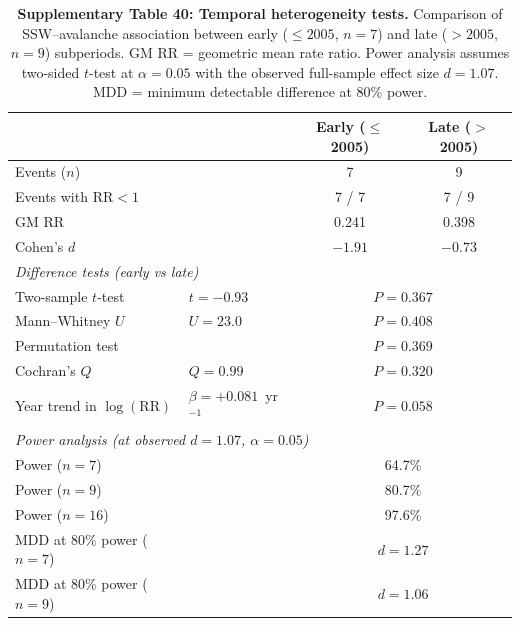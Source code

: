 \documentclass[11pt,letterpaper]{article}
\begin{document}
\begin{table}[!ht]
\centering
\caption{\textbf{Supplementary Table 40: Temporal heterogeneity tests.}
Comparison of SSW--avalanche association between early ($\leq 2005$, $n = 7$) and late ($> 2005$, $n = 9$) subperiods.
GM RR = geometric mean rate ratio.
Power analysis assumes two-sided $t$-test at $\alpha = 0.05$ with the observed full-sample effect size $d = 1.07$.
MDD = minimum detectable difference at 80\% power.}
\label{tab:temporal_het}
\small
\begin{tabular}{llcc}
\toprule
& & Early ($\leq$2005) & Late ($>$2005) \\
\midrule
Events ($n$) & & 7 & 9 \\
Events with $\mathrm{RR} < 1$ & & 7 / 7 & 7 / 9 \\
GM RR & & 0.241 & 0.398 \\
Cohen's $d$ & & $-1.91$ & $-0.73$ \\
\midrule
\multicolumn{4}{l}{\textit{Difference tests (early vs late)}} \\
Two-sample $t$-test & $t = -0.93$ & \multicolumn{2}{c}{$P = 0.367$} \\
Mann--Whitney $U$ & $U = 23.0$ & \multicolumn{2}{c}{$P = 0.408$} \\
Permutation test & & \multicolumn{2}{c}{$P = 0.369$} \\
Cochran's $Q$ & $Q = 0.99$ & \multicolumn{2}{c}{$P = 0.320$} \\
Year trend in $\log(\mathrm{RR})$ & $\beta = +0.081$~yr$^{-1}$ & \multicolumn{2}{c}{$P = 0.058$} \\
\midrule
\multicolumn{4}{l}{\textit{Power analysis (at observed $d = 1.07$, $\alpha = 0.05$)}} \\
Power ($n = 7$) & & \multicolumn{2}{c}{64.7\%} \\
Power ($n = 9$) & & \multicolumn{2}{c}{80.7\%} \\
Power ($n = 16$) & & \multicolumn{2}{c}{97.6\%} \\
MDD at 80\% power ($n = 7$) & & \multicolumn{2}{c}{$d = 1.27$} \\
MDD at 80\% power ($n = 9$) & & \multicolumn{2}{c}{$d = 1.06$} \\
\bottomrule
\end{tabular}
\end{table}
\end{document}
